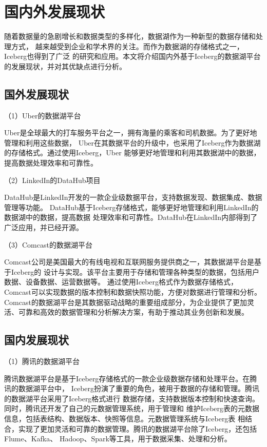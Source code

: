 \section{国内外发展现状}

随着数据量的急剧增长和数据类型的多样化，数据湖作为一种新型的数据存储和处理方式，
越来越受到企业和学术界的关注。而作为数据湖的存储格式之一，Iceberg也得到了广泛
的研究和应用。本文将介绍国内外基于Iceberg的数据湖平台的发展现状，并对其优缺点进行分析。

\subsection{国外发展现状}

（1）Uber的数据湖平台

Uber是全球最大的打车服务平台之一，拥有海量的乘客和司机数据。为了更好地管理和利用这些数据，
Uber在其数据平台的升级中，也采用了Iceberg作为数据湖的存储格式。通过使用Iceberg，Uber
能够更好地管理和利用其数据湖中的数据，提高数据处理效率和可靠性。

（2）LinkedIn的DataHub项目

DataHub是LinkedIn开发的一款企业级数据平台，支持数据发现、数据集成、数据管理等功能。
DataHub基于Iceberg存储格式，能够更好地管理和利用LinkedIn的数据湖中的数据，提高数据
处理效率和可靠性。DataHub在LinkedIn内部得到了广泛应用，并已经开源。

（3）Comcast的数据湖平台

Comcast公司是美国最大的有线电视和互联网服务提供商之一，其数据湖平台是基于Iceberg的
设计与实现。该平台主要用于存储和管理各种类型的数据，包括用户数据、设备数据、运营数据等。
通过使用Iceberg格式作为数据存储格式，Comcast可以实现数据的版本控制和数据快照功能，方便对数据进行管理和分析。
Comcast的数据湖平台是其数据驱动战略的重要组成部分，为企业提供了更加灵活、可靠和高效的数据管理和分析解决方案，有助于推动其业务创新和发展。

\subsection{国内发展现状}

（1）腾讯的数据湖平台

腾讯数据湖平台是基于Iceberg存储格式的一款企业级数据存储和处理平台。在腾讯的数据湖平台中，
Iceberg扮演了重要的角色，被用于数据的存储和管理。腾讯的数据湖平台采用了Iceberg格式进行
数据存储，支持数据版本控制和快速查询。同时，腾讯还开发了自己的元数据管理系统，用于管理和
维护Iceberg表的元数据信息，包括表结构、数据版本、快照等信息。元数据管理系统与Iceberg表
相结合，实现了更加灵活和可靠的数据管理。腾讯的数据湖平台除了Iceberg，还包括Flume、Kafka、
Hadoop、Spark等工具，用于数据采集、处理和分析。

